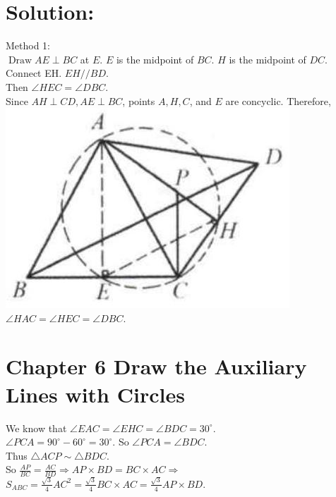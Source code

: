 \documentclass[10pt]{article}
\begin{document}
\section*{Solution:}
Method 1:\\
\(\operatorname{Draw} A E \perp B C\) at \(E\). \(E\) is the midpoint of \(B C\). \(H\) is the midpoint of \(D C\).\\
Connect EH. \(E H / / B D\).\\
Then \(\angle H E C=\angle D B C\).\\
Since \(A H \perp C D, A E \perp B C\), points \(A, H, C\), and \(E\) are concyclic. Therefore,\\
\includegraphics[max width=\textwidth, center]{2025_04_17_97bc1f7e44d93c271a88g-197(2)}\\
\(\angle H A C=\angle H E C=\angle D B C\).

\section*{Chapter 6 Draw the Auxiliary Lines with Circles}
We know that \(\angle E A C=\angle E H C=\angle B D C=30^{\circ}\).\\
\(\angle P C A=90^{\circ}-60^{\circ}=30^{\circ}\). So \(\angle P C A=\angle B D C\).\\
Thus \(\triangle A C P \sim \triangle B D C\).\\
So \(\frac{A P}{B C}=\frac{A C}{B D} \Rightarrow A P \times B D=B C \times A C \Rightarrow\) \(S_{A B C}=\frac{\sqrt{3}}{4} A C^{2}=\frac{\sqrt{3}}{4} B C \times A C=\frac{\sqrt{3}}{4} A P \times B D\).
\end{document}
